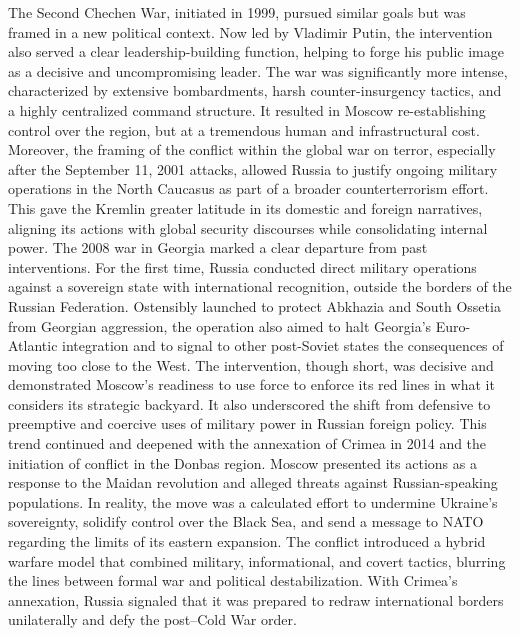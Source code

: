 \documentclass[12pt]{article}
\begin{document}
The Second Chechen War, initiated in 1999, pursued similar goals but was framed in a new political context. Now led by Vladimir Putin, the intervention also served a clear leadership-building function, helping to forge his public image as a decisive and uncompromising leader. The war was significantly more intense, characterized by extensive bombardments, harsh counter-insurgency tactics, and a highly centralized command structure. It resulted in Moscow re-establishing control over the region, but at a tremendous human and infrastructural cost. Moreover, the framing of the conflict within the global war on terror, especially after the September 11, 2001 attacks, allowed Russia to justify ongoing military operations in the North Caucasus as part of a broader counterterrorism effort. This gave the Kremlin greater latitude in its domestic and foreign narratives, aligning its actions with global security discourses while consolidating internal power.
The 2008 war in Georgia marked a clear departure from past interventions. For the first time, Russia conducted direct military operations against a sovereign state with international recognition, outside the borders of the Russian Federation. Ostensibly launched to protect Abkhazia and South Ossetia from Georgian aggression, the operation also aimed to halt Georgia’s Euro-Atlantic integration and to signal to other post-Soviet states the consequences of moving too close to the West. The intervention, though short, was decisive and demonstrated Moscow’s readiness to use force to enforce its red lines in what it considers its strategic backyard. It also underscored the shift from defensive to preemptive and coercive uses of military power in Russian foreign policy.
This trend continued and deepened with the annexation of Crimea in 2014 and the initiation of conflict in the Donbas region. Moscow presented its actions as a response to the Maidan revolution and alleged threats against Russian-speaking populations. In reality, the move was a calculated effort to undermine Ukraine’s sovereignty, solidify control over the Black Sea, and send a message to NATO regarding the limits of its eastern expansion. The conflict introduced a hybrid warfare model that combined military, informational, and covert tactics, blurring the lines between formal war and political destabilization. With Crimea’s annexation, Russia signaled that it was prepared to redraw international borders unilaterally and defy the post–Cold War order.
\end{document}
